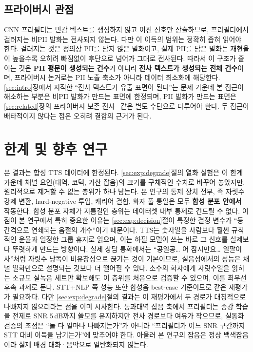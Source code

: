 \documentclass[11pt]{article}
\renewcommand{\emph}[1]{\textbf{#1}}
\begin{document}
\subsection{프라이버시 관점}
CNN 프리필터는 민감 텍스트를 생성하지 않고 이진 신호만 산출하므로, 프리필터에서 걸러지는
비PII 발화는 전사되지 않는다. 다만 이 이득의 범위는 정확히 좁혀 읽어야 한다. 걸러지는 것은
정의상 PII를 담지 않은 발화이고, 실제 PII를 담은 발화는 재현율이 높을수록 오히려 빠짐없이
후단으로 넘어가 그대로 전사된다. 따라서 이 구조가 줄이는 것은 \emph{PII 평문이 생성되는
건수}가 아니라 \emph{전사 텍스트가 생성되는 전체 건수}이며, 프라이버시 논거로는 PII 노출
축소가 아니라 데이터 최소화에 해당한다. \ref{sec:intro}장에서 지적한 ``전사 텍스트가 유출
표면이 된다''는 문제 가운데 본 접근이 해소하는 부분은 비PII 발화가 만드는 표면에 한정되며,
PII 발화가 만드는 표면은 \ref{sec:related}장의 프라이버시 보존
전사~\cite{ahmed2020preech} 같은 별도 수단으로 다루어야 한다. 두 접근이 배타적이지 않다는
점은 오히려 결합의 근거가 된다.

\section{한계 및 향후 연구}\label{sec:limit}
본 결과는 합성 TTS 데이터에 한정된다. \ref{sec:exp:degrade}절의 열화 실험은 이 한계 가운데
채널 요인(대역, 코덱, 가산 잡음)의 크기를 구체적인 수치로 바꾸어 놓았지만, 원리적으로 제거할
수 없는 층위가 하나 남는다. 본 연구의 통제 장치 전부, 즉 자릿수 강제 변환, hard-negative
투입, 캐리어 결합, 화자 풀 통일은 모두 \emph{합성 분포 안에서} 작동한다. 합성 분포 자체가
지름길인 층위는 데이터셋 내부 통제로 건드릴 수 없다. 이 점이 본 연구에서 특히 중요한 이유는
\ref{sec:exp:decision}절이 특정한 결정 변수가 ``등간격으로 연쇄되는 음절의 개수''이기
때문이다. TTS는 숫자열을 사람보다 훨씬 규칙적인 운율과 일정한 그룹 휴지로 읽으며, 이는 하필
모델이 쓰는 바로 그 신호를 실제보다 뚜렷하게 만드는 방향이다. 실제 상담 통화에서는 ``공일공…
어 잠시만요… 일팔이사''처럼 자릿수 낭독이 비유창성으로 끊기는 것이 기본이므로, 실음성에서의
성능은 채널 열화만으로 설명되는 것보다 더 떨어질 수 있다. 소수의 화자에게 자릿수열을 읽히는
소규모 실녹음 세트만 확보해도 이 층위를 처음으로 검증할 수 있으며, 이를 최우선 후속 과제로
둔다. STT+NLP 쪽 성능 또한 합성음 best-case 기준이므로 같은 재평가가 필요하다. 다만
\ref{sec:exp:degrade}절의 결과는 이 재평가에서 두 경로가 대칭적으로 나빠지지 않으리라는 점을
이미 시사한다. 통과대역 잡음 축에서 프리필터는 증강 학습을 전제로 SNR 5\,dB까지
쓸모를 유지하지만 전사 경로보다 여유가 작으므로, 실통화 검증의 초점은 ``둘 다 얼마나
나빠지는가''가 아니라 ``프리필터가 어느 SNR 구간까지 STT 대비 이득을 남기는가''에 맞추어야 한다.
아울러 본 연구의 잡음은 정상 백색잡음이라 실제 배경 대화·음악으로 일반화되지 않는다.
\end{document}
